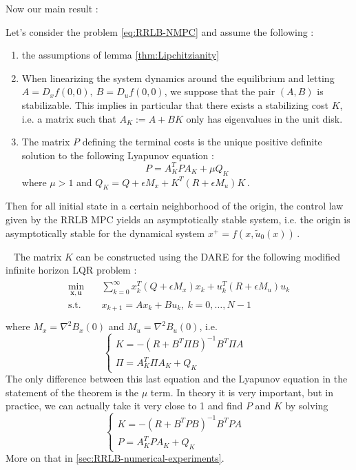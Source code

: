 \documentclass[12pt]{article}
\begin{document}
Now our main result :

\begin{theorem}\label{thm:nominal-stability}
	Let's consider the problem \ref{eq:RRLB-NMPC} and assume the following :
	\begin{enumerate}
		\item the assumptions of lemma \ref{thm:Lipchitzianity}

		\item When linearizing the system dynamics around the equilibrium and letting $A=D_xf(0,0),~B=D_uf(0,0)$, we suppose that the pair $(A,B)$ is stabilizable.
		This implies in particular that there exists a stabilizing cost $K$, i.e. a matrix such that $A_K:=A+BK$ only has eigenvalues in the unit disk.
		
		\item The matrix $P$ defining the terminal costs is the unique positive definite solution to the following Lyapunov equation :
		\begin{equation*}
			P=A_K^TPA_K+\mu Q_K
		\end{equation*}
		where $\mu>1$ and $Q_K=Q+\epsilon M_x+K^T(R+\epsilon M_u)K$\,.
	\end{enumerate}	
	Then for all initial state in a certain neighborhood of the origin, the control law given by the RRLB MPC yields an asymptotically stable system, i.e. the origin is asymptotically stable for the dynamical system $x^+=f(x,\tilde{u}_0(x))$\,.
\end{theorem}

\begin{remark}~
	The matrix $K$ can be constructed using the DARE for the following modified infinite horizon LQR problem :
	\begin{align}
		\begin{split}\label{eq:inf-LQR}
			\underset{\mathbf{x},\mathbf{u}}{\min} &\quad \sum_{k=0}^\infty x_k^T(Q+\epsilon M_x)x_k+u_k^T(R+\epsilon M_u)u_k\\
			\text{s.t.} &\quad x_{k+1}=Ax_k+Bu_k,~k=0,\dots,N-1\\
		\end{split}
	\end{align}
	where $M_x=\nabla^2B_x(0)$ and $M_u=\nabla^2B_u(0)$, i.e.
	$$\begin{cases}
		K=-(R+B^T\Pi B)^{-1}B^T\Pi A&\\
		\Pi=A_K^T\Pi A_K+Q_K
	\end{cases}$$
	The only difference between this last equation and the Lyapunov equation in the statement of the theorem is the $\mu$ term.
	In theory it is very important, but in practice, we can actually take it very close to 1 and find $P$ and $K$ by solving 
	$$\begin{cases}
		K=-(R+B^TP B)^{-1}B^TP A&\\
		P=A_K^TP A_K+Q_K
	\end{cases}$$
	More on that in \ref{sec:RRLB-numerical-experiments}.
\end{remark}
\end{document}
